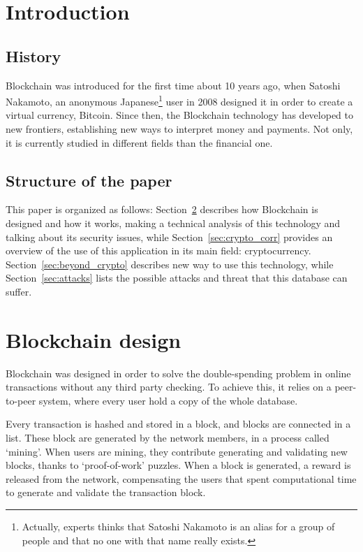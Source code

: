 \section{Introduction}

\subsection{History}
Blockchain was introduced for the first time about 10 years ago, when Satoshi
Nakamoto, an anonymous Japanese\footnote{Actually, experts thinks that Satoshi
Nakamoto is an alias for a group of people and that no one with that name
really exists.} user in 2008 designed it in order to create a virtual currency,
Bitcoin. Since then, the Blockchain technology has developed to new frontiers,
establishing new ways to interpret money and payments. Not only, it is currently
studied in different fields than the financial one.

\subsection{Structure of the paper}

This paper is organized as follows: Section~\ref{sec:block_design} describes
how Blockchain is designed and how it works, making a technical analysis of this
technology and talking about its security issues, while
Section~\ref{sec:crypto_corr} provides an overview of the
use of this application in its main field: cryptocurrency.
Section~\ref{sec:beyond_crypto} describes new way to use this technology, while
Section~\ref{sec:attacks} lists the possible attacks and threat that this
database can suffer.

\section{Blockchain design}
\label{sec:block_design}
Blockchain was designed in order to solve the double-spending problem in
online transactions without any third party checking\cite{nakamoto08}. To
achieve this, it relies on a peer-to-peer system, where every user hold a copy
of the whole database.

Every transaction is hashed and stored in a block, and blocks are connected in
a list. These block are generated by the network members, in a process called
`mining'. When users are mining, they contribute generating and validating new
blocks, thanks to `proof-of-work' puzzles. When a block is generated, a
reward is released from the network, compensating the users that spent
computational time to generate and validate the transaction block.

